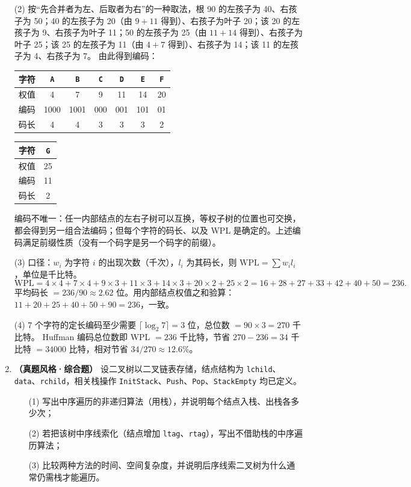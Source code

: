 \begin{enumerate}[resume]
(2) 按“先合并者为左、后取者为右”的一种取法，根 90 的左孩子为 40、右孩子为 50；40 的左孩子为 20（由 $9+11$ 得到）、右孩子为叶子 20；该 20 的左孩子为 9、右孩子为叶子 11；50 的左孩子为 25（由 $11+14$ 得到）、右孩子为叶子 25；该 25 的左孩子为 11（由 $4+7$ 得到）、右孩子为 14；该 11 的左孩子为 4、右孩子为 7。
由此得到编码：
\begin{center}
\begin{tabular}{ccccccc}
\toprule
字符 & \texttt{A} & \texttt{B} & \texttt{C} & \texttt{D} & \texttt{E} & \texttt{F} \\
\midrule
权值 & 4 & 7 & 9 & 11 & 14 & 20 \\
编码 & 1000 & 1001 & 000 & 001 & 101 & 01 \\
码长 & 4 & 4 & 3 & 3 & 3 & 2 \\
\bottomrule
\end{tabular}
\hspace{10pt}
\begin{tabular}{cc}
\toprule
字符 & \texttt{G} \\
\midrule
权值 & 25 \\
编码 & 11 \\
码长 & 2 \\
\bottomrule
\end{tabular}
\end{center}
编码不唯一：任一内部结点的左右子树可以互换，等权子树的位置也可交换，都会得到另一组合法编码；但每个字符的码长、以及 WPL 是确定的。上述编码满足前缀性质（没有一个码字是另一个码字的前缀）。

(3) 口径：$w_i$ 为字符 $i$ 的出现次数（千次），$l_i$ 为其码长，则 $\mathrm{WPL}=\sum w_i l_i$，单位是千比特。
\[
\mathrm{WPL}=4\times4+7\times4+9\times3+11\times3+14\times3+20\times2+25\times2
=16+28+27+33+42+40+50=236.
\]
平均码长 $=236/90\approx2.62$ 位。用内部结点权值之和验算：$11+20+25+40+50+90=236$，一致。

(4) 7 个字符的定长编码至少需要 $\lceil\log_2 7\rceil=3$ 位，总位数 $=90\times3=270$ 千比特。
Huffman 编码总位数即 WPL $=236$ 千比特，节省 $270-236=34$ 千比特 $=34000$ 比特，相对节省 $34/270\approx12.6\%$。
\else \answerarea[10] \fi

\item \textbf{（真题风格·综合题）} 设二叉树以二叉链表存储，结点结构为 \texttt{lchild}、\texttt{data}、\texttt{rchild}，相关栈操作 \texttt{InitStack}、\texttt{Push}、\texttt{Pop}、\texttt{StackEmpty} 均已定义。
\begin{enumerate}
    \item[(1)] 写出中序遍历的非递归算法（用栈），并说明每个结点入栈、出栈各多少次；
    \item[(2)] 若把该树中序线索化（结点增加 \texttt{ltag}、\texttt{rtag}），写出不借助栈的中序遍历算法；
    \item[(3)] 比较两种方法的时间、空间复杂度，并说明后序线索二叉树为什么通常仍需栈才能遍历。
\end{enumerate}


\end{enumerate}
